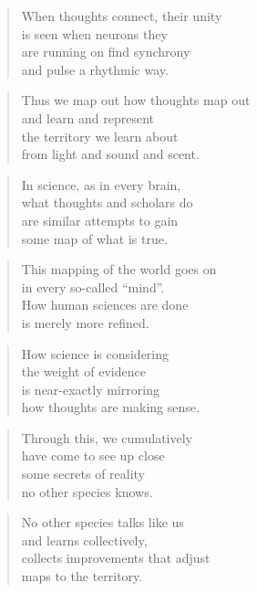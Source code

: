 \documentclass[10pt,a4paper]{article}
\begin{document}
\begin{paracol}{2}
\begin{verse}
When thoughts connect, their unity\\
is seen when neurons they\\
are running on find synchrony\\
and pulse a rhythmic way.
\end{verse}

\begin{verse}
Thus we map out how thoughts map out\\
and learn and represent\\
the territory we learn about\\
from light and sound and scent.
\end{verse}

\begin{verse}
In science, as in every brain,\\
what thoughts and scholars do\\
are similar attempts to gain\\
some map of what is true.
\end{verse}

\begin{verse}
This mapping of the world goes on\\
in every so-called “mind”.\\
How human sciences are done\\
is merely more refined.
\end{verse}

\begin{verse}
How science is considering\\
the weight of evidence\\
is near-exactly mirroring\\
how thoughts are making sense.
\end{verse}

\begin{verse}
Through this, we cumulatively\\
have come to see up close\\
some secrets of reality\\
no other species knows.
\end{verse}

\begin{verse}
No other species talks like us\\
and learns collectively,\\
collects improvements that adjust\\
maps to the territory.
\end{verse}


\end{paracol}
\end{document}
